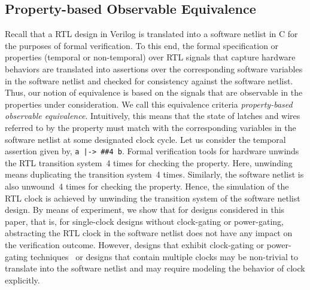 \subsection{Property-based Observable Equivalence}
%
Recall that a RTL design in Verilog is translated into a software 
netlist in C for the purposes of formal verification.  To this end, the formal specification or 
properties (temporal or non-temporal) over RTL signals that capture 
hardware behaviors are translated into assertions over the 
corresponding software variables in the software netlist and 
checked for consistency against the software netlist. 
Thus, our notion of equivalence is based on the signals 
that are observable in the properties under consideration. 
We call this equivalence criteria 
\emph{property-based observable equivalence}. 
Intuitively, this means that the state of latches and wires 
referred to by the property must match with the corresponding 
variables in the software netlist at some designated clock cycle.  
% 
Let us consider the temporal assertion given by, \texttt{a |-> \#\#4 b}.  
Formal verification tools for hardware unwinds the RTL transition 
system~4 times for checking the property. Here, unwinding means duplicating the 
transition system~4 times. Similarly, the software netlist is also unwound~4 times 
for checking the property. Hence, the simulation of the RTL clock is achieved by 
unwinding the transition system of the software netlist design. 
% 
By means of experiment, we show that for designs considered in this 
paper, that is, for single-clock designs without clock-gating 
or power-gating, abstracting the RTL clock in the software netlist 
does not have any impact on the verification outcome. However, designs that 
exhibit clock-gating or power-gating techniques~\cite{lowpower} or 
designs that contain multiple clocks may be non-trivial to translate into the 
software netlist and may require modeling the behavior of clock explicitly.
% 
% 
%
%
